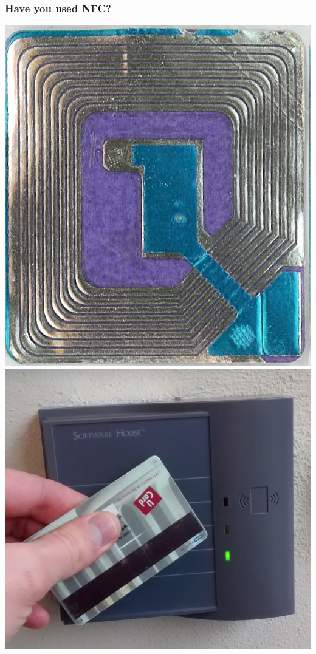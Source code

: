 \documentclass[unknownkeysallowed]{beamer}
\begin{document}
\begin{frame}
\frametitle{Have you used NFC?}
  		\begin{block}{}
  		  \begin{center}
    		\includegraphics[width=\linewidth,height=0.27\textheight,keepaspectratio]{figures/wikimediatag.jpg}
    		\includegraphics[width=\linewidth,height=0.27\textheight,keepaspectratio]{figures/gayHall.jpg}

\end{center}
\end{block}
\end{frame}
\end{document}

